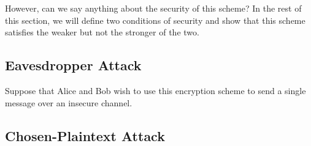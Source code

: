 \documentclass{report}
\begin{document}
However, can we say anything about the security of this scheme?  In the rest of this section, we will define two
conditions of security and show that this scheme satisfies the weaker but not the stronger of the two.


\subsection{Eavesdropper Attack}

Suppose that Alice and Bob wish to use this encryption scheme to send a single message over an insecure channel.  

\subsection{Chosen-Plaintext Attack}
\subsection{}



% 
% 
% 
\end{document}
